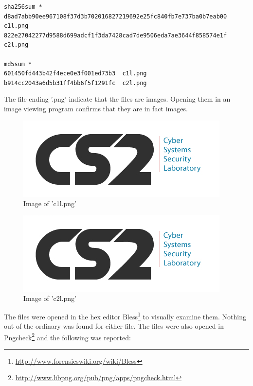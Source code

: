 \documentclass[a4paper,10pt,oneside]{article}
\begin{document}
\begin{lstlisting}[caption= SHA256 and MD5 sum of files in Exercise6\textunderscore Steganography]
sha256sum *
d8ad7abb90ee967108f37d3b702016827219692e25fc840fb7e737ba0b7eab00  c1l.png
822e27042277d9588d699adcf1f3da7428cad7de9506eda7ae3644f858574e1f  c2l.png

md5sum *
601450fd443b42f4ece0e3f001ed73b3  c1l.png
b914cc2043a6d5b31ff4bb6f5f1291fc  c2l.png
\end{lstlisting}

The file ending '.png' indicate that the files are images. Opening them in an image viewing program confirms that they are in fact images.

\begin{figure}[ht]
  \includegraphics[width=\textwidth]{images/c1l}
  \caption{Image of 'c1l.png'}
  \centering
\end{figure}





\begin{figure}[ht]
  \includegraphics[width=\textwidth]{images/c2l}
  \caption{Image of 'c2l.png'}
  \centering
\end{figure}

The files were opened in the hex editor Bless\footnote{\url{http://www.forensicswiki.org/wiki/Bless}}
to visually examine them. Nothing out of the ordinary was found for either file.
The files were also opened in Pngcheck\footnote{\url{http://www.libpng.org/pub/png/apps/pngcheck.html}}
and the following was reported:
\end{document}
